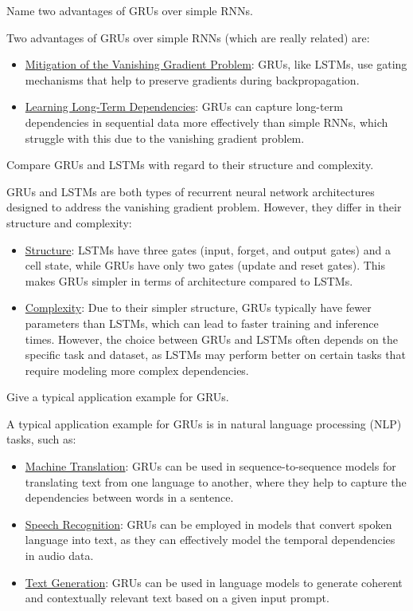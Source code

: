 \begin{ejercicio}
    Name two advantages of GRUs over simple RNNs.

    Two advantages of GRUs over simple RNNs (which are really related) are:
    \begin{itemize}
        \item \ul{Mitigation of the Vanishing Gradient Problem}: GRUs, like LSTMs, use gating mechanisms that help to preserve gradients during backpropagation.
        \item \ul{Learning Long-Term Dependencies}: GRUs can capture long-term dependencies in sequential data more effectively than simple RNNs, which struggle with this due to the vanishing gradient problem.
    \end{itemize}
\end{ejercicio}
\begin{ejercicio}
    Compare GRUs and LSTMs with regard to their structure and complexity.

    GRUs and LSTMs are both types of recurrent neural network architectures designed to address the vanishing gradient problem. However, they differ in their structure and complexity:
    \begin{itemize}
        \item \ul{Structure}: LSTMs have three gates (input, forget, and output gates) and a cell state, while GRUs have only two gates (update and reset gates). This makes GRUs simpler in terms of architecture compared to LSTMs.
        \item \ul{Complexity}: Due to their simpler structure, GRUs typically have fewer parameters than LSTMs, which can lead to faster training and inference times. However, the choice between GRUs and LSTMs often depends on the specific task and dataset, as LSTMs may perform better on certain tasks that require modeling more complex dependencies.
    \end{itemize}
\end{ejercicio}
\begin{ejercicio}
    Give a typical application example for GRUs.

    A typical application example for GRUs is in natural language processing (NLP) tasks, such as:
    \begin{itemize}
        \item \ul{Machine Translation}: GRUs can be used in sequence-to-sequence models for translating text from one language to another, where they help to capture the dependencies between words in a sentence.
        \item \ul{Speech Recognition}: GRUs can be employed in models that convert spoken language into text, as they can effectively model the temporal dependencies in audio data.
        \item \ul{Text Generation}: GRUs can be used in language models to generate coherent and contextually relevant text based on a given input prompt.
    \end{itemize}
\end{ejercicio}

